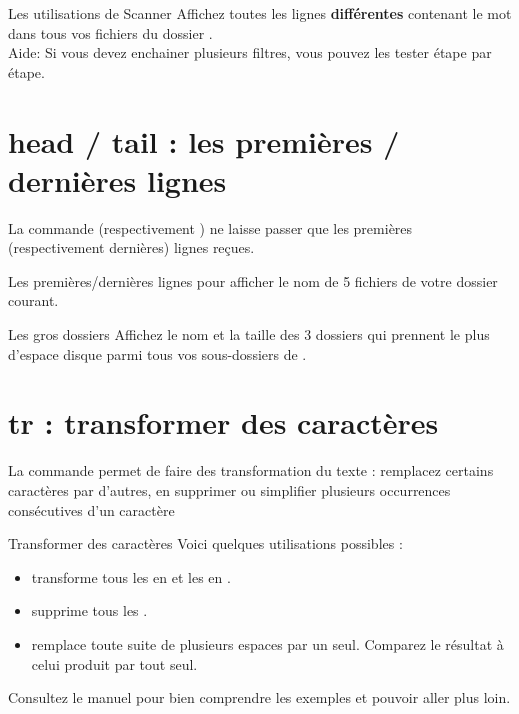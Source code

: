 \documentclass[a4paper,11pt]{style-esi/td}
\begin{document}
		\begin{Exercice}{Les utilisations de Scanner}
			Affichez toutes les lignes \textbf{différentes}
			contenant le mot  dans tous vos fichiers 
			du dossier .
			\\Aide: 
			Si vous devez enchainer plusieurs filtres,
			vous pouvez les tester étape par étape.
		\end{Exercice}

	\section{head / tail : les premières / dernières lignes}
	
		La commande  (respectivement )
		ne laisse passer que les premières (respectivement dernières)
		lignes reçues.

		\begin{Experience}{Les premières/dernières lignes}
			pour afficher le nom de 5 fichiers  de votre dossier courant.
		\end{Experience}

		\begin{Exercice}{Les gros dossiers}
			Affichez le nom et la taille des 3 dossiers 
			qui prennent le plus d'espace disque 
			parmi tous vos sous-dossiers de . 
		\end{Exercice}

	\section{tr : transformer des caractères}
	
		La commande  permet de faire des transformation du texte :
		remplacez certains caractères par d'autres, en supprimer ou simplifier 
		plusieurs occurrences consécutives d'un caractère 

		\begin{Exemple}{Transformer des caractères}
			Voici quelques utilisations possibles :
			\begin{itemize}
			\item 
				transforme tous les  en 
				et les  en .
			\item
				supprime tous les .
			\item 
				remplace toute suite de plusieurs espaces par un seul.
				Comparez le résultat à celui produit par  tout seul.
			\end{itemize}
			Consultez le manuel pour bien comprendre les exemples
			et pouvoir aller plus loin.
		\end{Exemple}
\end{document}
